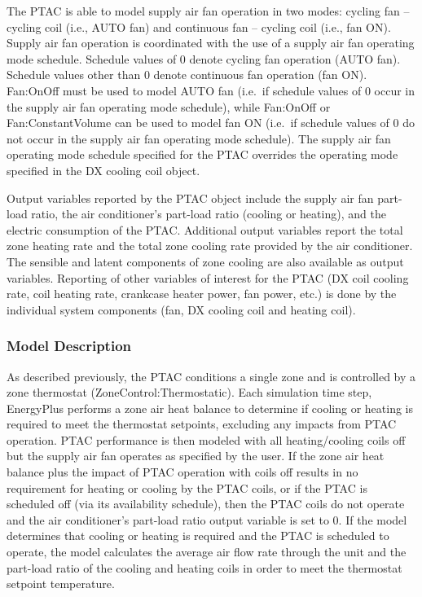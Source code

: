 The PTAC is able to model supply air fan operation in two modes: cycling fan -- cycling coil (i.e., AUTO fan) and continuous fan -- cycling coil (i.e., fan ON). Supply air fan operation is coordinated with the use of a supply air fan operating mode schedule. Schedule values of 0 denote cycling fan operation (AUTO fan). Schedule values other than 0 denote continuous fan operation (fan ON). Fan:OnOff must be used to model AUTO fan (i.e.~if schedule values of 0 occur in the supply air fan operating mode schedule), while Fan:OnOff or Fan:ConstantVolume can be used to model fan ON (i.e.~if schedule values of 0 do not occur in the supply air fan operating mode schedule). The supply air fan operating mode schedule specified for the PTAC overrides the operating mode specified in the DX cooling coil object.

Output variables reported by the PTAC object include the supply air fan part-load ratio, the air conditioner's part-load ratio (cooling or heating), and the electric consumption of the PTAC. Additional output variables report the total zone heating rate and the total zone cooling rate provided by the air conditioner. The sensible and latent components of zone cooling are also available as output variables. Reporting of other variables of interest for the PTAC (DX coil cooling rate, coil heating rate, crankcase heater power, fan power, etc.) is done by the individual system components (fan, DX cooling coil and heating coil).

\subsubsection{Model Description}\label{model-description-017}

As described previously, the PTAC conditions a single zone and is controlled by a zone thermostat (ZoneControl:Thermostatic). Each simulation time step, EnergyPlus performs a zone air heat balance to determine if cooling or heating is required to meet the thermostat setpoints, excluding any impacts from PTAC operation. PTAC performance is then modeled with all heating/cooling coils off but the supply air fan operates as specified by the user. If the zone air heat balance plus the impact of PTAC operation with coils off results in no requirement for heating or cooling by the PTAC coils, or if the PTAC is scheduled off (via its availability schedule), then the PTAC coils do not operate and the air conditioner's part-load ratio output variable is set to 0. If the model determines that cooling or heating is required and the PTAC is scheduled to operate, the model calculates the average air flow rate through the unit and the part-load ratio of the cooling and heating coils in order to meet the thermostat setpoint temperature.

